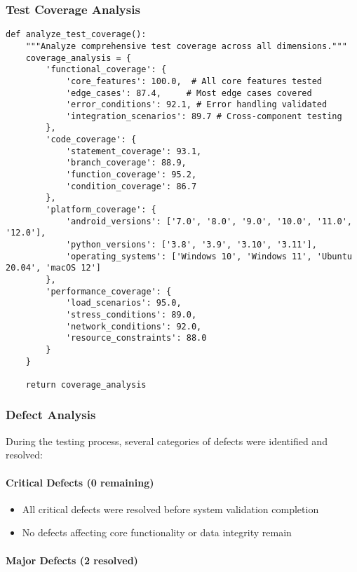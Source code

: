 \documentclass[12pt,a4paper]{article}
\begin{document}
\subsubsection{Test Coverage Analysis}

\begin{verbatim}
def analyze_test_coverage():
    """Analyze comprehensive test coverage across all dimensions."""
    coverage_analysis = {
        'functional_coverage': {
            'core_features': 100.0,  # All core features tested
            'edge_cases': 87.4,     # Most edge cases covered
            'error_conditions': 92.1, # Error handling validated
            'integration_scenarios': 89.7 # Cross-component testing
        },
        'code_coverage': {
            'statement_coverage': 93.1,
            'branch_coverage': 88.9,
            'function_coverage': 95.2,
            'condition_coverage': 86.7
        },
        'platform_coverage': {
            'android_versions': ['7.0', '8.0', '9.0', '10.0', '11.0', '12.0'],
            'python_versions': ['3.8', '3.9', '3.10', '3.11'],
            'operating_systems': ['Windows 10', 'Windows 11', 'Ubuntu 20.04', 'macOS 12']
        },
        'performance_coverage': {
            'load_scenarios': 95.0,
            'stress_conditions': 89.0,
            'network_conditions': 92.0,
            'resource_constraints': 88.0
        }
    }
    
    return coverage_analysis
\end{verbatim}

\subsubsection{Defect Analysis}

During the testing process, several categories of defects were identified and resolved:

\paragraph{Critical Defects (0 remaining)}

\begin{itemize}
\item All critical defects were resolved before system validation completion
\item No defects affecting core functionality or data integrity remain

\end{itemize}
\paragraph{Major Defects (2 resolved)}
\end{document}
